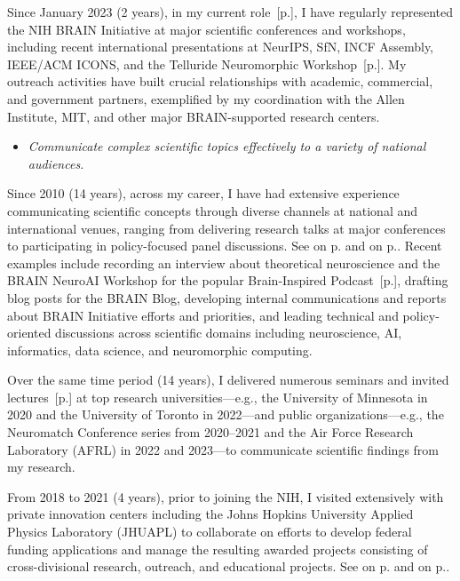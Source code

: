 \documentclass[10pt]{article}
\newcommand{\see}[1]{[\textcolor{hopkinsblue}{p.\pageref{sec:#1}}]}
\newcommand{\cfcf}[2]{\textcolor{hopkinsblue}{See \emph{\nameref{sec:#1}} on
  p.\pageref{sec:#1} and \emph{\nameref{sec:#2}} on p.\pageref{sec:#2}}}
\begin{document}
Since January 2023 (2 years), in my current role~\see{jobobd}, I have
regularly represented the NIH BRAIN Initiative at major scientific
conferences and workshops, including recent international presentations at
NeurIPS, SfN, INCF Assembly, IEEE/ACM ICONS, and the Telluride Neuromorphic
Workshop~\see{intltalks}. My outreach activities have built crucial
relationships with academic, commercial, and government partners, exemplified by
my coordination with the Allen Institute, MIT, and other major BRAIN-supported
research centers.

\pagebreak
\begin{itemize}
  \color{hopkinsblue}
  \item \emph{Communicate complex scientific topics effectively to a variety of
national audiences.}
\end{itemize}

Since 2010 (14 years), across my career, I have had extensive experience
communicating scientific concepts through diverse channels at national
and international venues, ranging from delivering research talks at
major conferences to participating in policy-focused panel discussions.
\cfcf{talks}{comms}. Recent examples include recording an interview about
theoretical neuroscience and the BRAIN NeuroAI Workshop for the popular
Brain-Inspired Podcast~\see{media}, drafting blog posts for the BRAIN Blog,
developing internal communications and reports about BRAIN Initiative efforts
and priorities, and leading technical and policy-oriented discussions
across scientific domains including neuroscience, AI, informatics, data
science, and neuromorphic computing. 

Over the same time period (14 years), I delivered numerous seminars and invited
lectures~\see{talks} at top research universities---e.g., the University
of Minnesota in 2020 and the University of Toronto in 2022---and public
organizations---e.g., the Neuromatch Conference series from 2020--2021 and
the Air Force Research Laboratory (AFRL) in 2022 and 2023---to communicate
scientific findings from my research.

From 2018 to 2021 (4 years), prior to joining the NIH, I visited extensively
with private innovation centers including the Johns Hopkins University
Applied Physics Laboratory (JHUAPL) to collaborate on efforts to develop
federal funding applications and manage the resulting awarded projects
consisting of cross-divisional research, outreach, and educational projects.
\cfcf{resprogram}{eduprogram}.
\end{document}
